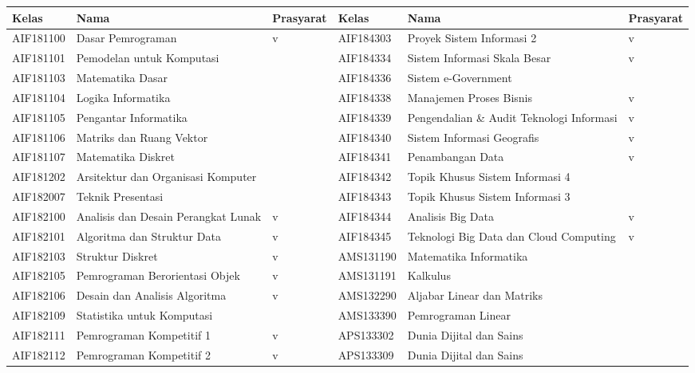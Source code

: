 \begin{enumerate}
\begin{table}[H]
\centering
\label{tab:kelasmatakuliah2018_rincian_3}
\begin{tabular}{|p{2cm}|p{3.5cm}|p{1.75cm}|p{2cm}|p{3.5cm}|p{1.75cm}|}
\hline
\textbf{Kelas} & \textbf{Nama} & \textbf{Prasyarat} & \textbf{Kelas} & \textbf{Nama} & \textbf{Prasyarat} \\ \hline
AIF181100 & Dasar Pemrograman & v & AIF184303 & Proyek Sistem Informasi 2 & v \\ \hline
AIF181101 & Pemodelan untuk Komputasi &  & AIF184334 & Sistem Informasi Skala Besar & v \\ \hline
AIF181103 & Matematika Dasar & & AIF184336 & Sistem e-Government & \\ \hline
AIF181104 & Logika Informatika &  & AIF184338 & Manajemen Proses Bisnis & v \\ \hline
AIF181105 & Pengantar Informatika &  & AIF184339 & Pengendalian \& Audit Teknologi Informasi & v \\ \hline
AIF181106 & Matriks dan Ruang Vektor &  & AIF184340 & Sistem Informasi Geografis & v \\ \hline
AIF181107 & Matematika Diskret &  & AIF184341 & Penambangan Data & v \\ \hline
AIF181202 & Arsitektur dan Organisasi Komputer & & AIF184342 & Topik Khusus Sistem Informasi 4 & \\ \hline
AIF182007 & Teknik Presentasi & & AIF184343 & Topik Khusus Sistem Informasi 3 & \\ \hline
AIF182100 & Analisis dan Desain Perangkat Lunak & v & AIF184344 & Analisis Big Data & v \\ \hline
AIF182101 & Algoritma dan Struktur Data & v & AIF184345 & Teknologi Big Data dan Cloud Computing & v \\ \hline
AIF182103 & Struktur Diskret & v & AMS131190 & Matematika Informatika &  \\ \hline
AIF182105 & Pemrograman Berorientasi Objek & v & AMS131191 & Kalkulus &  \\ \hline
AIF182106 & Desain dan Analisis Algoritma & v & AMS132290 & Aljabar Linear dan Matriks &  \\ \hline
AIF182109 & Statistika untuk Komputasi & & AMS133390 & Pemrograman Linear & \\ \hline
AIF182111 & Pemrograman Kompetitif 1 & v & APS133302 & Dunia Dijital dan Sains &  \\ \hline
AIF182112 & Pemrograman Kompetitif 2 & v & APS133309 & Dunia Dijital dan Sains &  \\ \hline

\end{tabular}
\end{table}
\end{enumerate}
